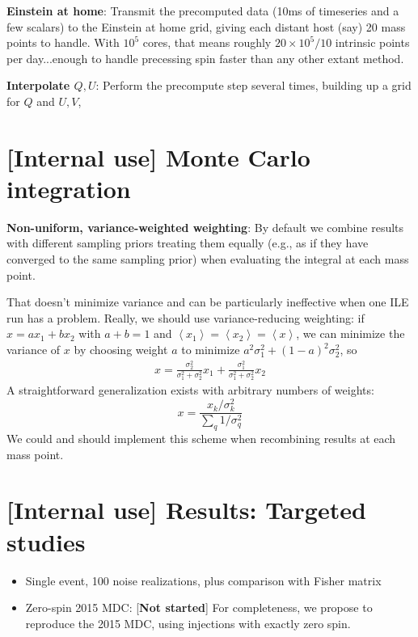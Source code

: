 \noindent \textbf{Einstein at home}: Transmit the precomputed data (10ms of timeseries and a few scalars) to the
Einstein at home grid, giving each distant host (say) 20 mass points to handle.  With $10^5$ cores, that means roughly
$20\times10^5/10$ intrinsic points per day...enough to handle precessing spin faster than any other extant method.

\noindent \textbf{Interpolate $Q,U$}: Perform the precompute step several times, building up a grid for $Q$ and $U,V$,

\section{[Internal use] Monte Carlo integration}

\textbf{Non-uniform, variance-weighted weighting}: By default we combine results with different sampling priors treating
them equally (e.g., as if they have converged to the same sampling prior) when evaluating the integral at each mass
point.  

That doesn't minimize variance and can be particularly
ineffective when one ILE run has a problem.  Really, we should use variance-reducing weighting: if $x=ax_1 +b x_2$ with $a+b=1$ and
$\left<x_1\right> =\left<x_2\right> =\left<x\right>$, we can minimize the variance of $x$ by choosing weight $a$ to
minimize $a^2 \sigma_1^2 + (1-a)^2 \sigma_2^2$, so 
\begin{eqnarray}
x = \frac{\sigma_2^2}{\sigma_1^2+\sigma_2^2} x_1 +  \frac{\sigma_1^2}{\sigma_1^2+\sigma_2^2} x_2
\end{eqnarray}
A straightforward generalization exists with arbitrary numbers of weights:
\[
x = \frac{x_k/\sigma_k^2}{\sum_q 1/\sigma_q^2}
\]
We could and should implement this scheme when recombining results at each mass point. 

\section{[Internal use] Results: Targeted studies}

\begin{itemize}
\item Single event, 100 noise realizations, plus comparison with Fisher matrix

\item Zero-spin 2015 MDC: [\textbf{Not started}]  For completeness, we propose to reproduce the 2015 MDC,  using
  injections with exactly zero spin.

\end{itemize}


